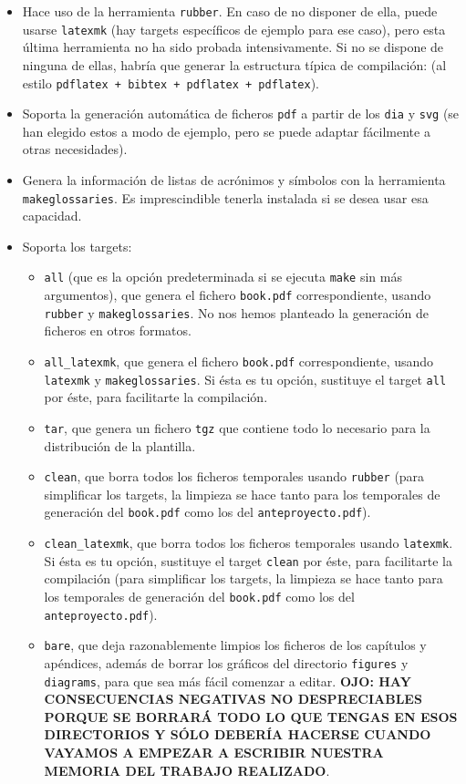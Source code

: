 {\begin{itemize}
    \item Hace uso de la herramienta \texttt{rubber}. En caso de no disponer de ella, puede usarse \texttt{latexmk} (hay targets específicos de ejemplo para ese caso), pero esta última herramienta no ha sido probada intensivamente. Si no se dispone de ninguna de ellas, habría que generar la estructura típica de compilación: (al estilo \texttt{pdflatex + bibtex + pdflatex + pdflatex}).
    \item Soporta la generación automática de ficheros \texttt{pdf} a partir de los \texttt{dia} y \texttt{svg} (se han elegido estos a modo de ejemplo, pero se puede adaptar fácilmente a otras necesidades).
    \item Genera la información de listas de acrónimos y símbolos con la herramienta \texttt{makeglossaries}. Es imprescindible tenerla instalada si se desea usar esa capacidad.
    \item Soporta los targets:
          \begin{itemize}
            \item \texttt{all} (que es la opción predeterminada si se ejecuta \texttt{make} sin más argumentos), que genera el fichero \texttt{book.pdf} correspondiente, usando \texttt{rubber} y \texttt{makeglossaries}. No nos hemos planteado la generación de ficheros en otros formatos.
            \item \texttt{all\_latexmk}, que genera el fichero \texttt{book.pdf} correspondiente, usando \texttt{latexmk} y \texttt{makeglossaries}. Si ésta es tu opción, sustituye el target \texttt{all} por éste, para facilitarte la compilación.

            \item \texttt{tar}, que genera un fichero \texttt{tgz} que contiene todo lo necesario para la distribución de la plantilla.
            \item \texttt{clean}, que borra todos los ficheros temporales usando \texttt{rubber} (para simplificar los targets, la limpieza se hace tanto para los temporales de generación del \texttt{book.pdf} como los del \texttt{anteproyecto.pdf}).
            \item \texttt{clean\_latexmk}, que borra todos los ficheros temporales usando \texttt{latexmk}. Si ésta es tu opción, sustituye el target \texttt{clean} por éste, para facilitarte la compilación (para simplificar los targets, la limpieza se hace tanto para los temporales de generación del \texttt{book.pdf} como los del \texttt{anteproyecto.pdf}).

            \item \texttt{bare}, que deja razonablemente limpios los ficheros de los capítulos y apéndices, además de borrar los gráficos del directorio \texttt{figures} y \texttt{diagrams}, para que sea más fácil comenzar a editar. \textbf{OJO: HAY CONSECUENCIAS NEGATIVAS NO DESPRECIABLES PORQUE SE BORRARÁ TODO LO QUE TENGAS EN ESOS DIRECTORIOS Y SÓLO DEBERÍA HACERSE CUANDO VAYAMOS A EMPEZAR A ESCRIBIR NUESTRA MEMORIA DEL TRABAJO REALIZADO}.


\end{itemize}
\end{itemize}}
